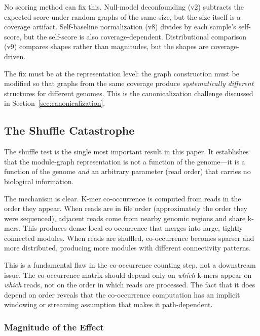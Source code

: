 \documentclass{../yalumba}
\begin{document}
No scoring method can fix this.  Null-model deconfounding (v2) subtracts
the expected score under random graphs of the same size, but the size
itself is a coverage artifact.  Self-baseline normalization (v8) divides
by each sample's self-score, but the self-score is also coverage-dependent.
Distributional comparison (v9) compares shapes rather than magnitudes,
but the shapes are coverage-driven.

The fix must be at the representation level:  the graph construction
must be modified so that graphs from the same coverage produce
\emph{systematically different} structures for different genomes.  This
is the canonicalization challenge discussed in
Section~\ref{sec:canonicalization}.

\subsection{The Shuffle Catastrophe}
\label{sec:shuffle-catastrophe}

The shuffle test is the single most important result in this paper.  It
establishes that the module-graph representation is not a function of
the genome---it is a function of the genome \emph{and} an arbitrary
parameter (read order) that carries no biological information.


The mechanism is clear.  K-mer co-occurrence is computed from reads in
the order they appear.  When reads are in file order (approximately the
order they were sequenced), adjacent reads come from nearby genomic
regions and share k-mers.  This produces dense local co-occurrence that
merges into large, tightly connected modules.  When reads are shuffled,
co-occurrence becomes sparser and more distributed, producing more
modules with different connectivity patterns.

This is a fundamental flaw in the co-occurrence counting step, not a
downstream issue.  The co-occurrence matrix should depend only on
\emph{which} k-mers appear on \emph{which} reads, not on the order in
which reads are processed.  The fact that it does depend on order
reveals that the co-occurrence computation has an implicit windowing or
streaming assumption that makes it path-dependent.

\subsubsection{Magnitude of the Effect}
\end{document}
